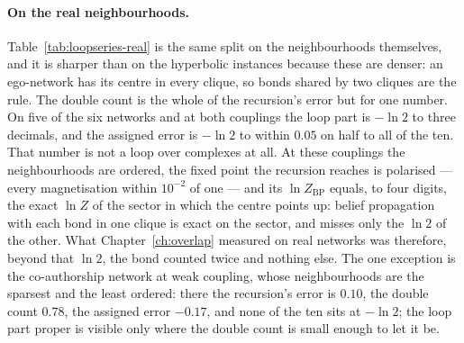 \paragraph{On the real neighbourhoods.} Table~\ref{tab:loopseries-real}
is the same split on the neighbourhoods themselves, and it is sharper than
on the hyperbolic instances because these are denser: an ego-network has
its centre in every clique, so bonds shared by two cliques are the rule.
The double count is the whole of the recursion's error but for one
number. On five of the six networks and at both couplings the loop part
is $-\ln2$ to three decimals, and the assigned error is $-\ln2$ to within
$0.05$ on half to all of the ten. That number is not a loop over
complexes at all. At these couplings the neighbourhoods are ordered, the
fixed point the recursion reaches is polarised --- every magnetisation
within $10^{-2}$ of one --- and its $\ln Z_{\mathrm{BP}}$ equals, to four
digits, the exact $\ln Z$ of the sector in which the centre points up:
belief propagation with each bond in one clique is exact on the sector,
and misses only the $\ln2$ of the other. What Chapter~\ref{ch:overlap}
measured on real networks was therefore, beyond that $\ln2$, the bond
counted twice and nothing else. The one exception is the co-authorship
network at weak coupling, whose neighbourhoods are the sparsest and the
least ordered: there the recursion's error is $0.10$, the double count
$0.78$, the assigned error $-0.17$, and none of the ten sits at $-\ln2$;
the loop part proper is visible only where the double count is small
enough to let it be.


